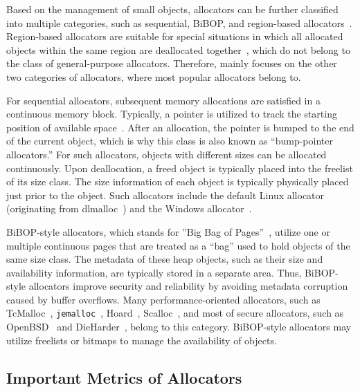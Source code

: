Based on the management of small objects, allocators can be further classified into multiple categories, such as sequential, BiBOP, and region-based allocators~\citep{DieHarder, Gay:1998:MME:277650.277748}. Region-based allocators are suitable for special situations in which all allocated objects within the same region are deallocated together~\citep{Gay:1998:MME:277650.277748}, which do not belong to the class of general-purpose allocators. Therefore, \MP{} mainly focuses on the other two categories of allocators, where most popular allocators belong to.

For sequential allocators, subsequent memory allocations are satisfied in a continuous memory block. Typically, a pointer is utilized to track the starting position of available space~\citep{Cling}. After an allocation, the pointer is bumped to the end of the current object, which is why this class is also known as ``bump-pointer allocators.'' For such allocators, objects with different sizes can be allocated continuously. Upon deallocation, a freed object is typically placed into the freelist of its size class. The size information of each object is typically physically placed just prior to the object. Such allocators include the default Linux allocator (originating from dlmalloc~\citep{dlmalloc}) and the Windows allocator~\citep{DieHarder}.  

BiBOP-style allocators, which stands for ''Big Bag of Pages''~\citep{hanson1980}, utilize one or multiple continuous pages that are treated as a ``bag'' used to hold objects of the same size class. The metadata of these heap objects, such as their size and availability information, are typically stored in a separate area. Thus, BiBOP-style allocators improve security and reliability by avoiding metadata corruption caused by buffer overflows. Many performance-oriented allocators, such as TcMalloc~\citep{tcmalloc}, \texttt{jemalloc}~\citep{jemalloc}, Hoard~\citep{Hoard}, Scalloc~\citep{Scalloc}, and most of secure allocators, such as OpenBSD~\citep{openbsd} and DieHarder~\citep{DieHarder}, belong to this category. BiBOP-style allocators may utilize freelists or bitmaps to manage the availability of objects. 


\subsection{Important Metrics of Allocators}


